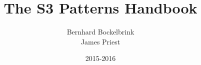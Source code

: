 \documentclass[a5paper]{scrreprt}
\begin{document}
	\title{The S3 Patterns Handbook}
	\author{Bernhard Bockelbrink\\James Priest}
	\date{2015-2016}
	\maketitle
	
	\setcounter{tocdepth}{0}
	\tableofcontents
	\setcounter{tocdepth}{1}
	\listoffigures
    
    
\end{document}
